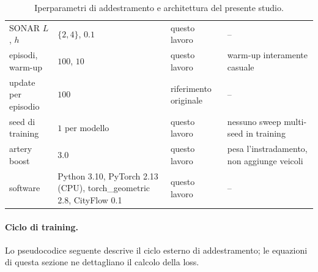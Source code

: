 \begin{table}[htbp]
\begin{tabular}{@{}p{3.2cm}p{2.9cm}p{2.9cm}p{4.3cm}@{}}
    SONAR $L$, $h$               & $\{2,4\}$, $0.1$                                                    & questo lavoro         & --                                                             \\
    episodi, warm-up             & $100$, $10$                                                         & questo lavoro         & warm-up interamente casuale                                    \\
    update per episodio          & $100$                                                               & riferimento originale & --                                                             \\
    seed di training             & $1$ per modello                                                     & questo lavoro         & nessuno sweep multi-seed in training                           \\
    artery boost                 & $3.0$                                                               & questo lavoro         & pesa l'instradamento, non aggiunge veicoli                     \\
    software                     & Python 3.10, PyTorch 2.13 (CPU), torch\_geometric 2.8, CityFlow 0.1 & questo lavoro         & --                                                             \\
    \bottomrule
  \end{tabular}
  \caption{Iperparametri di addestramento e architettura del presente studio.}
  \label{tab:iperparametri}
\end{table}

\paragraph{Ciclo di training.} Lo pseudocodice seguente descrive il ciclo
esterno di addestramento; le equazioni di questa sezione ne dettagliano il
calcolo della loss.

